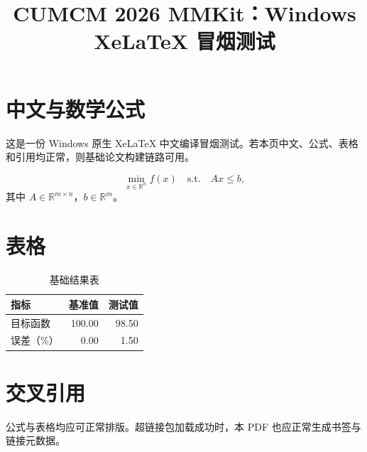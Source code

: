 \documentclass[12pt,a4paper]{ctexart}
\title{CUMCM 2026 MMKit：Windows XeLaTeX 冒烟测试}
\author{}
\date{}
\begin{document}
\maketitle

\section{中文与数学公式}
这是一份 Windows 原生 XeLaTeX 中文编译冒烟测试。若本页中文、公式、表格和引用均正常，则基础论文构建链路可用。

\begin{equation}
  \min_{x \in \mathbb{R}^n} f(x) \quad
  \text{s.t.}\quad Ax \le b,
\end{equation}
其中 $A \in \mathbb{R}^{m\times n}$，$b \in \mathbb{R}^{m}$。

\section{表格}
\begin{table}[htbp]
  \centering
  \caption{基础结果表}
  \begin{tabular}{lrr}
    \toprule
    指标 & 基准值 & 测试值 \\
    \midrule
    目标函数 & 100.00 & 98.50 \\
    误差（\%） & 0.00 & 1.50 \\
    \bottomrule
  \end{tabular}
\end{table}

\section{交叉引用}
公式与表格均应可正常排版。超链接包加载成功时，本 PDF 也应正常生成书签与链接元数据。
\end{document}
